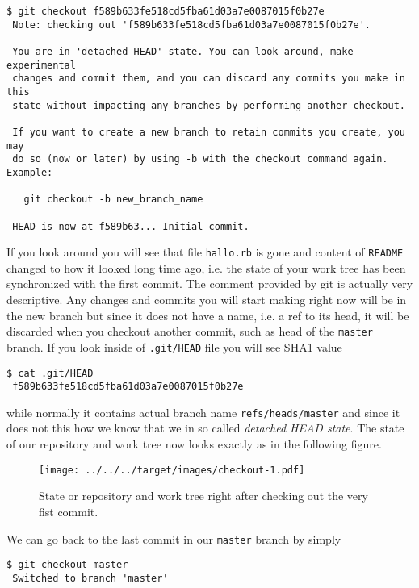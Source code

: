 \documentclass{article}
\theoremstyle{definition}
\begin{document}
        \begin{Verbatim}[frame=single]
 $ git checkout f589b633fe518cd5fba61d03a7e0087015f0b27e
 Note: checking out 'f589b633fe518cd5fba61d03a7e0087015f0b27e'.

 You are in 'detached HEAD' state. You can look around, make experimental
 changes and commit them, and you can discard any commits you make in this
 state without impacting any branches by performing another checkout.

 If you want to create a new branch to retain commits you create, you may
 do so (now or later) by using -b with the checkout command again. Example:

   git checkout -b new_branch_name

 HEAD is now at f589b63... Initial commit.
        \end{Verbatim}
        If you look around you will see that file \texttt{hallo.rb} is gone and content of \texttt{README} changed to
        how it looked long time ago, i.e. the state of your work tree has been synchronized with the first commit. The
        comment provided by git is actually very descriptive. Any changes and commits you will start making right now
        will be in the new branch but since it does not have a name, i.e. a ref to its head, it will be discarded when
        you checkout another commit, such as head of the \texttt{master} branch. If you look inside
        of \texttt{.git/HEAD} file you will see SHA1 value

        \begin{Verbatim}[frame=single]
 $ cat .git/HEAD
 f589b633fe518cd5fba61d03a7e0087015f0b27e
        \end{Verbatim}
        while normally it contains actual branch name \texttt{refs/heads/master} and since it does not this how we know
        that we in so called {\em detached HEAD state}. The state of our repository and work tree now looks exactly as
        in the following figure.

        \begin{figure}[h]
        \centering\texttt{[image: ../../../target/images/checkout-1.pdf]}
        \caption{State or repository and work tree right after checking out the very fist commit.\label{fig:checkout-1}}
        \end{figure}
        \newpage
        \noindent We can go back to the last commit in our \texttt{master} branch by simply
        \begin{Verbatim}[frame=single]
 $ git checkout master
 Switched to branch 'master'
        \end{Verbatim}
\end{document}

